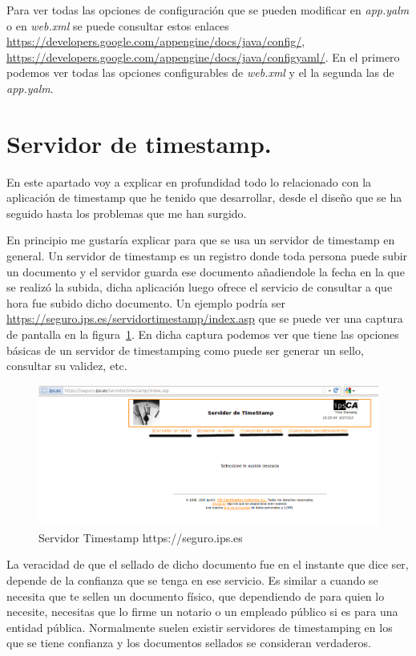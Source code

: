 Para ver todas las opciones de configuración que se pueden modificar en \textit{app.yalm} o en \textit{web.xml} se puede consultar estos enlaces \url{https://developers.google.com/appengine/docs/java/config/}, \url{https://developers.google.com/appengine/docs/java/configyaml/}. En el primero podemos ver todas las opciones configurables de \textit{web.xml} y el la segunda las de \textit{app.yalm}.

\section{Servidor de timestamp.}
En este apartado voy a explicar en profundidad todo lo relacionado con la aplicación de timestamp que he tenido que desarrollar, desde el diseño que se ha seguido hasta los problemas que me han surgido.

En principio me gustaría explicar para que se usa un servidor de timestamp en general. Un servidor de timestamp es un registro donde toda persona puede subir un documento y el servidor guarda ese documento añadiendole la fecha en la que se realizó la subida, dicha aplicación luego ofrece el servicio de consultar a que hora fue subido dicho documento. Un ejemplo podría ser \url{https://seguro.ips.es/servidortimestamp/index.asp} que se puede ver una captura de pantalla en la figura~\ref{fig:server_ips_timestamp}. En dicha captura podemos ver que tiene las opciones básicas de un servidor de timestamping como puede ser generar un sello, consultar su validez, etc. 

\begin{figure}[hbt]
  \centering
    \includegraphics[scale=0.5]{./GoogleAppEngine/imagenes/server_ips_timestamp.png}
  \caption{Servidor Timestamp https://seguro.ips.es}
  \label{fig:server_ips_timestamp}
\end{figure}

La veracidad de que el sellado de dicho documento fue en el instante que dice ser, depende de la confianza que se tenga en ese servicio. Es similar a cuando se necesita que te sellen un documento físico, que dependiendo de para quien lo necesite, necesitas que lo firme un notario o un empleado público si es para una entidad pública. Normalmente suelen existir servidores de timestamping en los que se tiene confianza y los documentos sellados se consideran verdaderos.

